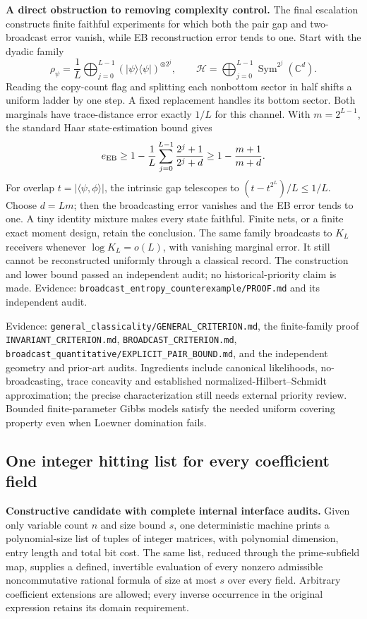 \documentclass[11pt]{article}
\begin{document}
\textbf{A direct obstruction to removing complexity control.} The final escalation constructs finite faithful experiments for which both the pair gap and two-broadcast error vanish, while EB reconstruction error tends to one. Start with the dyadic family
\[
 \rho_\psi=\frac1L\bigoplus_{j=0}^{L-1}
       (|\psi\rangle\langle\psi|)^{\otimes 2^j},
 \qquad
 \mathcal H=\bigoplus_{j=0}^{L-1}\operatorname{Sym}^{2^j}(\mathbb C^d).
\]
Reading the copy-count flag and splitting each nonbottom sector in half shifts a uniform ladder by one step. A fixed replacement handles its bottom sector. Both marginals have trace-distance error exactly $1/L$ for this channel. With $m=2^{L-1}$, the standard Haar state-estimation bound gives
\[
 e_{\rm EB}\ge1-\frac1L\sum_{j=0}^{L-1}\frac{2^j+1}{2^j+d}
              \ge1-\frac{m+1}{m+d}.
\]
For overlap $t=|\langle\psi,\phi\rangle|$, the intrinsic gap telescopes to $(t-t^{2^L})/L\le1/L$. Choose $d=Lm$; then the broadcasting error vanishes and the EB error tends to one. A tiny identity mixture makes every state faithful. Finite nets, or a finite exact moment design, retain the conclusion. The same family broadcasts to $K_L$ receivers whenever $\log K_L=o(L)$, with vanishing marginal error. It still cannot be reconstructed uniformly through a classical record. The construction and lower bound passed an independent audit; no historical-priority claim is made. Evidence: \texttt{broadcast\_entropy\_counterexample/PROOF.md} and its independent audit.

Evidence: \texttt{general\_classicality/GENERAL\_CRITERION.md}, the finite-family proof \texttt{INVARIANT\_CRITERION.md}, \texttt{BROADCAST\_CRITERION.md}, \texttt{broadcast\_quantitative/EXPLICIT\_PAIR\_BOUND.md}, and the independent geometry and prior-art audits. Ingredients include canonical likelihoods, no-broadcasting, trace concavity and established normalized-Hilbert--Schmidt approximation; the precise characterization still needs external priority review. Bounded finite-parameter Gibbs models satisfy the needed uniform covering property even when Loewner domination fails.

\subsection{One integer hitting list for every coefficient field}
\textbf{Constructive candidate with complete internal interface audits.} Given only variable count $n$ and size bound $s$, one deterministic machine prints a polynomial-size list of tuples of integer matrices, with polynomial dimension, entry length and total bit cost. The same list, reduced through the prime-subfield map, supplies a defined, invertible evaluation of every nonzero admissible noncommutative rational formula of size at most $s$ over every field. Arbitrary coefficient extensions are allowed; every inverse occurrence in the original expression retains its domain requirement.
\end{document}
